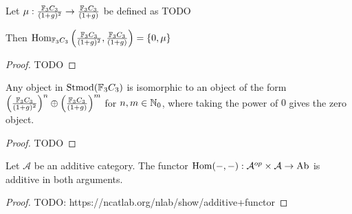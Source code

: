 \begin{theorem} \label{thm:f_3c_3_mu}
    Let \( \mu: \frac{{\mathbb{F}}_3C_3}{(1 + g)^2} \to \frac{{\mathbb{F}}_3C_3}{(1 + g)} \) be defined as TODO

    Then \( \operatorname{Hom}_{{\mathbb{F}}_3C_3}\left(\frac{{\mathbb{F}}_3C_3}{(1 + g)^2}, \frac{{\mathbb{F}}_3C_3}{(1 + g)}\right) = \left\{0, \mu\right\} \)
\end{theorem}
\begin{proof}
    TODO
\end{proof}

\begin{theorem}
    Any object in \( \operatorname{Stmod}({\mathbb{F}}_3C_3) \) is isomorphic to an object of the form \( \left( \frac{{\mathbb{F}}_3C_3}{(1 + g)^2} \right)^n \oplus \left( \frac{{\mathbb{F}}_3C_3}{(1 + g)} \right)^m \) for \( n, m \in {\mathbb{N}}_0 \), where taking the power of \( 0 \) gives the zero object.
\end{theorem}
\begin{proof}
    TODO
\end{proof}

\begin{theorem} %
    Let \( \mathcal{A} \) be an additive category. The functor \( \operatorname{Hom}(-, -): \mathcal{A}^{op} \times \mathcal{A} \to \operatorname{Ab} \) is additive in both arguments.
\end{theorem}
\begin{proof}
    TODO: https://ncatlab.org/nlab/show/additive+functor
\end{proof}






